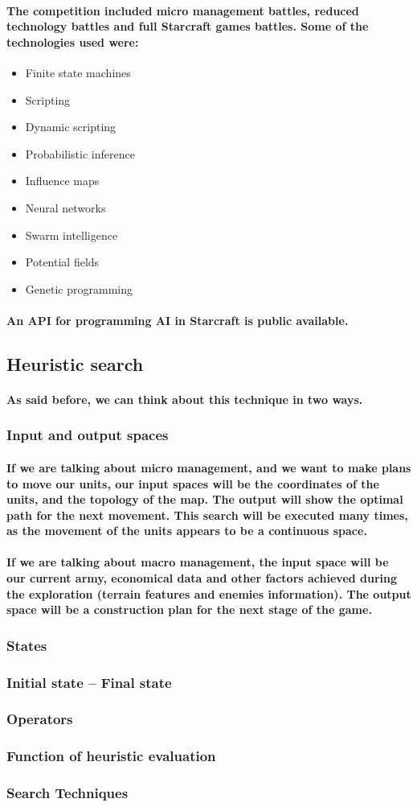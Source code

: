\documentclass[a4paper,10pt]{article}
\newcommand{\p}[1]{\paragraph{\indent\textnormal{#1}}}
\begin{document}
      \p{The competition included micro management battles, reduced technology battles and full Starcraft games battles. Some of the technologies used were:}

      \begin{itemize}
       \item Finite state machines
       \item Scripting
       \item Dynamic scripting
       \item Probabilistic inference
       \item Influence maps
       \item Neural networks
       \item Swarm intelligence
       \item Potential fields
       \item Genetic programming
      \end{itemize}

      \p{An API for programming AI in Starcraft is public available.}

\subsection{Heuristic search}

  \p{As said before, we can think about this technique in two ways.}

  \subsubsection{Input and output spaces}

    \p{If we are talking about micro management, and we want to make plans to move our units, our input spaces will be the coordinates of the units, and the topology of the map. The output will show the optimal path for the next movement. This search will be executed many times, as the movement of the units appears to be a continuous space.}

    \p{If we are talking about macro management, the input space will be our current army, economical data and other factors achieved during the exploration (terrain features and enemies information). The output space will be a construction plan for the next stage of the game.}


  \subsubsection{States}

  \subsubsection{Initial state – Final state}
\subsubsection{Operators}
\subsubsection{Function of heuristic evaluation}
\subsubsection{Search Techniques}
\end{document}

